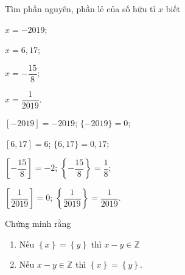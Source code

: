 \btvn
\begin{vn}
	Tìm phần nguyên, phần lẻ của số hữu tỉ $x$ biết
	\begin{listEX}[4]
		\item $x=-2019$;
		\item $x=6,17$;
		\item $x=-\dfrac{15}{8}$;
		\item $x=\dfrac{1}{2019}$.
	\end{listEX}
	\loigiai
	{
		\begin{listEX}[2]
			\item $[-2019]=-2019$; $\{-2019\}=0$;
			\item $[6,17]=6$; $\{6,17\}=0,17$;
			\item $\left[-\dfrac{15}{8}\right]=-2$; $\left\{-\dfrac{15}{8}\right\}=\dfrac{1}{8}$;
			\item $\left[\dfrac{1}{2019} \right]=0$; $\left\{\dfrac{1}{2019}\right\}=\dfrac{1}{2019}$.
		\end{listEX}
	}
\end{vn}
\begin{vn}Chứng minh rằng
\begin{enumerate}
	\item Nếu $\left\{ x \right\} = \left\{ y \right\}$ thì $x-y\in \mathbb{Z}$
	\item Nếu $x-y\in \mathbb{Z}$ thì $\left\{ x \right\} = \left\{ y \right\}$.
\end{enumerate}
\end{vn}
